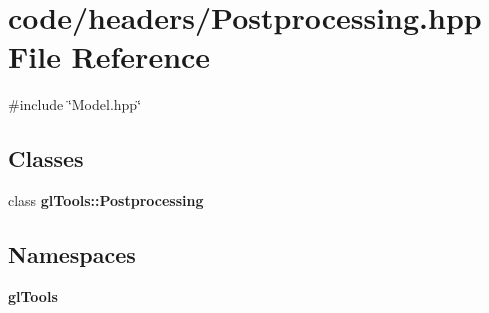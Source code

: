 \section{code/headers/\+Postprocessing.hpp File Reference}
\label{_postprocessing_8hpp}
{\ttfamily \#include \char`\"{}Model.\+hpp\char`\"{}}\newline
\subsection*{Classes}
\begin{DoxyCompactItemize}
\item 
class \textbf{ gl\+Tools\+::\+Postprocessing}
\end{DoxyCompactItemize}
\subsection*{Namespaces}
\begin{DoxyCompactItemize}
\item 
 \textbf{ gl\+Tools}
\end{DoxyCompactItemize}
